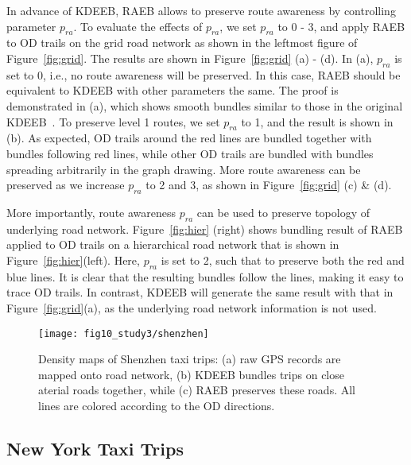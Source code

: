 In advance of KDEEB, RAEB allows to preserve route awareness by controlling parameter $p_{ra}$.
To evaluate the effects of $p_{ra}$, we set $p_{ra}$ to 0 - 3, and apply RAEB to OD trails on the grid road network as shown in the leftmost figure of Figure~\ref{fig:grid}.
The results are shown in Figure~\ref{fig:grid} (a) - (d).
In (a), $p_{ra}$ is set to 0, i.e., no route awareness will be preserved.
In this case, RAEB should be equivalent to KDEEB with other parameters the same.
The proof is demonstrated in (a), which shows smooth bundles similar to those in the original KDEEB~\cite{hurter2012graph}.
To preserve level 1 routes, we set $p_{ra}$ to 1, and the result is shown in (b).
As expected, OD trails around the red lines are bundled together with bundles following red lines, while other OD trails are bundled with bundles spreading arbitrarily in the graph drawing.
More route awareness can be preserved as we increase $p_{ra}$ to 2 and 3, as shown in Figure~\ref{fig:grid} (c) \& (d).

More importantly, route awareness $p_{ra}$ can be used to preserve topology of underlying road network.
Figure~\ref{fig:hier} (right) shows bundling result of RAEB applied to OD trails on a hierarchical road network that is shown in Figure~\ref{fig:hier}(left).
Here, $p_{ra}$ is set to 2, such that to preserve both the red and blue lines.
It is clear that the resulting bundles follow the lines, making it easy to trace OD trails.
In contrast, KDEEB will generate the same result with that in Figure~\ref{fig:grid}(a), as the underlying road network information is not used.

\begin{figure*}[t]
	\centering
	\texttt{[image: fig10\_study3/shenzhen]}
	\vspace{-2mm}
	\caption{
	Density maps of Shenzhen taxi trips: (a) raw GPS records are mapped onto road network, (b) KDEEB bundles trips on close aterial roads together, while (c) RAEB preserves these roads. All lines are colored according to the OD directions.
	}
	\label{fig:shenzhen}
	\vspace{-4mm}
\end{figure*}

\subsection{New York Taxi Trips}
\label{ssec:study2}


